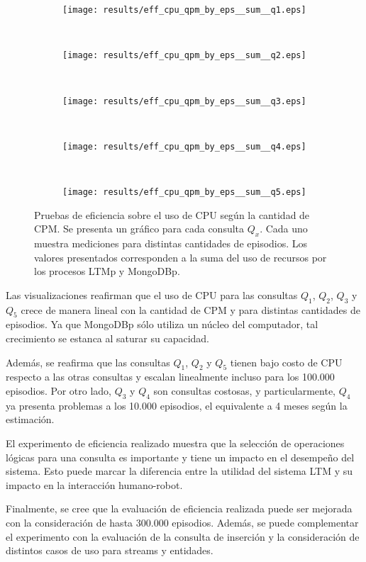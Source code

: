 \begin{figure}[!ht]
	\centering
	\begin{subfigure}[b]{0.45\textwidth}
		\texttt{[image: results/eff\_cpu\_qpm\_by\_eps\_\_sum\_\_q1.eps]}
		\caption{}
		\label{result:eff_cpu_qpm_by_eps__sum__q1}
	\end{subfigure}
	~
	\begin{subfigure}[b]{0.45\textwidth}
		\texttt{[image: results/eff\_cpu\_qpm\_by\_eps\_\_sum\_\_q2.eps]}
		\caption{}
		\label{result:eff_cpu_qpm_by_eps__sum__q2}
	\end{subfigure}
	~
	\begin{subfigure}[b]{0.45\textwidth}
		\texttt{[image: results/eff\_cpu\_qpm\_by\_eps\_\_sum\_\_q3.eps]}
		\caption{}
		\label{result:eff_cpu_qpm_by_eps__sum__q3}
	\end{subfigure}
	~
	\begin{subfigure}[b]{0.45\textwidth}
		\texttt{[image: results/eff\_cpu\_qpm\_by\_eps\_\_sum\_\_q4.eps]}
		\caption{}
		\label{result:eff_cpu_qpm_by_eps__sum__q4}
	\end{subfigure}
	~
	\begin{subfigure}[b]{0.45\textwidth}
		\texttt{[image: results/eff\_cpu\_qpm\_by\_eps\_\_sum\_\_q5.eps]}
		\caption{}
		\label{result:eff_cpu_qpm_by_eps__sum__q5}
	\end{subfigure}
	\caption[Eficiencia: Uso de CPU según CPM para cada consulta de interés.]
	{\small Pruebas de eficiencia sobre el uso de CPU según la cantidad de CPM. Se presenta un gráfico para cada consulta $Q_x$. Cada uno muestra mediciones para distintas cantidades de episodios. Los valores presentados corresponden a la suma del uso de recursos por los procesos LTMp y MongoDBp.}
	\label{result:eff_cpu_qpm_by_eps__sum}
\end{figure}

Las visualizaciones reafirman que el uso de CPU para las consultas $Q_1$, $Q_2$, $Q_3$ y $Q_5$ crece de manera lineal con la cantidad de CPM y para distintas cantidades de episodios. Ya que MongoDBp sólo utiliza un núcleo del computador, tal crecimiento se estanca al saturar su capacidad.

Además, se reafirma que las consultas $Q_1$, $Q_2$ y $Q_5$ tienen bajo costo de CPU respecto a las otras consultas y escalan linealmente incluso para los 100.000 episodios. Por otro lado, $Q_3$ y $Q_4$ son consultas costosas, y particularmente, $Q_4$ ya presenta problemas a los 10.000 episodios, el equivalente a 4 meses según la estimación.


El experimento de eficiencia realizado muestra que la selección de operaciones lógicas para una consulta es importante y tiene un impacto en el desempeño del sistema. Esto puede marcar la diferencia entre la utilidad del sistema LTM y su impacto en la interacción humano-robot. 

Finalmente, se cree que la evaluación de eficiencia realizada puede ser mejorada con la consideración de hasta 300.000 episodios. Además, se puede complementar el experimento con la evaluación de la consulta de inserción y la consideración de distintos casos de uso para streams y entidades.
